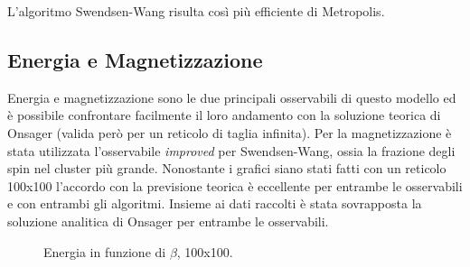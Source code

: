 L'algoritmo Swendsen-Wang risulta così più efficiente di Metropolis.
\newpage

\subsection{Energia e Magnetizzazione}
Energia e magnetizzazione sono le due principali osservabili di questo modello ed è possibile confrontare facilmente il loro andamento con la soluzione teorica di Onsager (valida però per un reticolo di taglia infinita).
Per la magnetizzazione è stata utilizzata l'osservabile \emph{improved} per Swendsen-Wang, ossia la frazione degli spin nel cluster più grande.
Nonostante i grafici siano stati fatti con un reticolo 100x100 l'accordo con la previsione teorica è eccellente per entrambe le osservabili e con entrambi gli algoritmi.
Insieme ai dati raccolti è stata sovrapposta la soluzione analitica di Onsager per entrambe le osservabili.
\begin{figure}[h]
\caption{Energia in funzione di $\beta$, 100x100.}
\end{figure}

